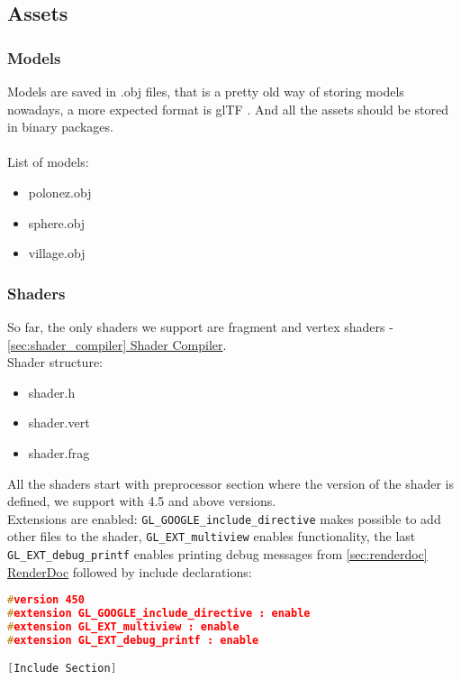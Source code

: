 \newpage
\subsection{Assets}
\label{sec:assets}
\subsubsection{Models}
\hspace{\parindent}
Models are saved in .obj files, that is a pretty old way of storing models nowadays, a more expected format is glTF \cite{gltf}. And all the assets should be stored in binary packages.\\\\
List of models:
\begin{itemize}
    \item polonez.obj \cite{PolonezModel}
    \item sphere.obj
    \item village.obj \cite{VillageModel}
\end{itemize}
\subsubsection{Shaders}
\hspace{\parindent}
So far, the only shaders we support are fragment and vertex shaders - \hyperref[sec:shader_compiler]{\ref*{sec:shader_compiler} Shader Compiler}.\\
Shader structure:
\begin{itemize}
    \item shader.h
    \item shader.vert
    \item shader.frag
\end{itemize}

All the shaders start with preprocessor section where the version of the shader is defined, we support with 4.5 and above versions.\\
Extensions are enabled: \texttt{GL\_GOOGLE\_include\_directive} makes possible to add other files to the shader, \texttt{GL\_EXT\_multiview} enables \cite{multiview} functionality, the last \texttt{GL\_EXT\_debug\_printf} enables printing debug messages from \hyperref[sec:renderdoc]{\ref*{sec:renderdoc} RenderDoc} followed by include declarations:
\begin{lstlisting}[language=c++, caption=Common a shader preprocessor]
#version 450
#extension GL_GOOGLE_include_directive : enable
#extension GL_EXT_multiview : enable
#extension GL_EXT_debug_printf : enable

[Include Section]
\end{lstlisting}

